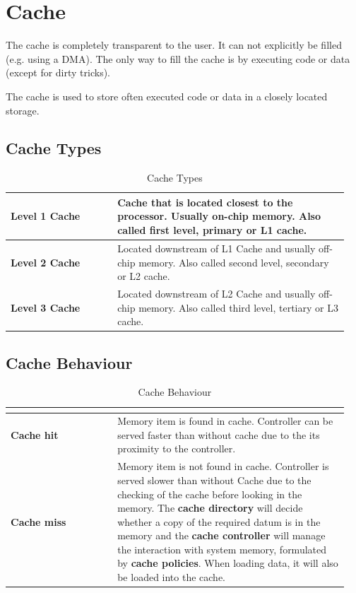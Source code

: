 \section{Cache }
	The cache is completely transparent to the user. It can not explicitly be filled (e.g. using a DMA). The only way to fill the cache is by executing code or data (except for dirty tricks).
	
	The cache is used to store often executed code or data in a closely located storage.
	
	\subsection{Cache Types}
		\begin{table}[H]
			\centering
			\begin{tabular}{|>{\bfseries}p{0.3\linewidth}|p{0.65\linewidth}|}
				\hline
				Level 1 Cache
					& Cache that is located closest to the processor. Usually on-chip memory. Also called first level, primary or L1 cache.\\
				\hline
				Level 2 Cache
					& Located downstream of L1 Cache and usually off-chip memory. Also called second level, secondary or L2 cache.\\
				\hline
				Level 3 Cache
					& Located downstream of L2 Cache and usually off-chip memory. Also called third level, tertiary or L3 cache.\\
				\hline	
			\end{tabular}
			\caption{Cache Types}
		\end{table}
		
	\subsection{Cache Behaviour }
	
		\begin{table}[H]
			\centering
			\begin{tabular}{|>{\bfseries}p{0.3\linewidth}|p{0.65\linewidth}|}
				\hline
				\multicolumn{2}{|c|}{Controller is looking for a memory item}\\
				\hline
				Cache hit
					& Memory item is found in cache. Controller can be served faster than without cache due to the its proximity to the controller.\\
				\hline
				Cache miss
					& Memory item is not found in cache. Controller is served slower than without Cache due to the checking of the cache before looking in the memory. The \textbf{cache directory} will decide whether a copy of the required datum is in the memory and the \textbf{cache controller} will manage the interaction with system memory, formulated by \textbf{cache policies}. When loading data, it will also be loaded into the cache.\\
				\hline
			\end{tabular}
			\caption{Cache Behaviour}
		\end{table}
		
